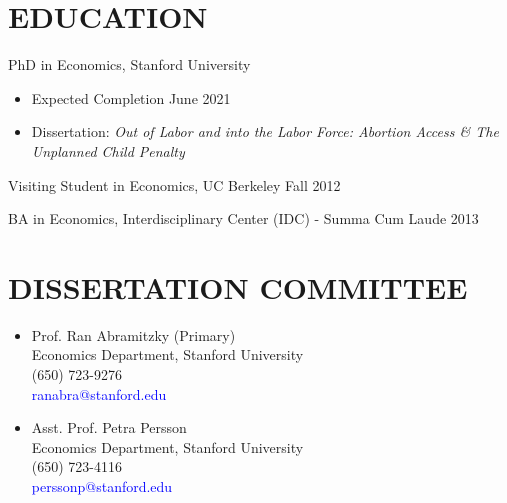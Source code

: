\documentclass[margin]{res} %
\begin{document}
\begin{resume}



\section{EDUCATION}

PhD in Economics, Stanford University
\begin{itemize}
	\item Expected Completion  \hfill June 2021
	\item Dissertation: \textit{Out of Labor and into the Labor Force: Abortion Access \& The Unplanned Child Penalty}
\end{itemize}	

Visiting Student in Economics, UC Berkeley  \hfill Fall 2012 

BA in Economics, Interdisciplinary Center (IDC) - Summa Cum Laude \hfill 2013


\section{DISSERTATION COMMITTEE}


\begin{multicols}{2}
	\begin{itemize}
		 \item[] Prof. Ran Abramitzky (Primary) \\
		Economics Department, Stanford University \\
		(650) 723-9276 \\
		\textcolor{blue}{ranabra@stanford.edu} \\

		 \item[] Asst. Prof. Petra Persson \\
		Economics Department, Stanford University \\
		(650) 723-4116 \\
		\textcolor{blue}{perssonp@stanford.edu} \\


\end{itemize}
\end{multicols}
\end{resume}
\end{document}
